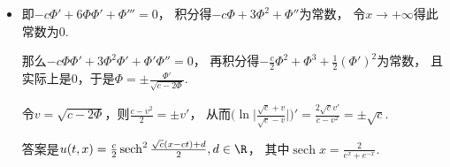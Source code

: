 \begin{itemize}
只需$\begin{pmatrix}
    \partial_T\\ \\\partial_X
\end{pmatrix}=\begin{pmatrix}
    1&-\frac{3}{2}\\ \\0&\frac{5}{2}
\end{pmatrix}\begin{pmatrix}
    \partial_t\\ \\\partial_x
\end{pmatrix}$，

即$\begin{pmatrix}
    \partial_t\\ \\\partial_x
\end{pmatrix}=\begin{pmatrix}
    \frac{\partial T}{\partial t}&\frac{\partial X}{\partial t}\\ \\
    \frac{\partial T}{\partial x}&\frac{\partial X}{\partial x}
\end{pmatrix}\begin{pmatrix}
    \partial_T\\ \\\partial_X
\end{pmatrix}=\begin{pmatrix}
    1&\frac{3}{5}\\ \\0&\frac{2}{5}
\end{pmatrix}\begin{pmatrix}
    \partial_T\\ \\\partial_X
\end{pmatrix}$，

因此取
$\left\{\begin{aligned}
T&=t\\X&=\frac{3}{5}t+\frac{2}{5}x
\end{aligned}\right.$。


\item[5.] 即$-c\varPhi'+6\varPhi\varPhi'+\varPhi'''=0$，
积分得$-c\varPhi+3\varPhi^2+\varPhi''$为常数，
令$x\rightarrow+\infty$得此常数为$0$.

那么$-c\varPhi\varPhi'+3\varPhi^2\varPhi'+\varPhi'\varPhi''=0$，
再积分得$-\frac{c}{2}\varPhi^2+\varPhi^3+\frac{1}{2}(\varPhi')^2$为常数，
且实际上是$0$，于是$\varPhi=\pm\frac{\varPhi'}{\sqrt{c-2\varPhi}}$.

令$v=\sqrt{c-2\varPhi}$，则$\frac{c-v^2}{2}=\pm v'$，
从而$\big(\ln\big|\frac{\sqrt{c}+v}{\sqrt{c}-v}\big|\big)'
=\frac{2\sqrt{c}v'}{c-v^2}=\pm\sqrt{c}$.

答案是$u(t,x)=\frac{c}{2}\operatorname{sech}^2\frac{\sqrt{c}(x-ct)+d}{2},d\in\R$，
其中$\operatorname{sech}x=\frac{2}{e^x+e^{-x}}$.
\end{itemize}

